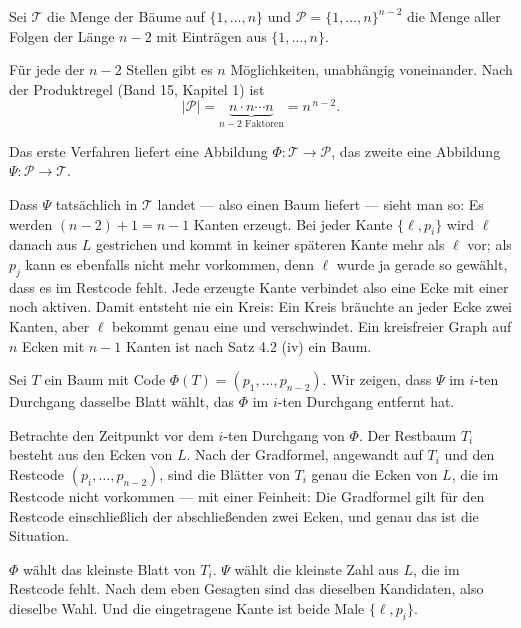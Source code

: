 \begin{merksatz}
Sei $\mathcal{T}$ die Menge der Bäume auf $\{1,\ldots,n\}$ und $\mathcal{P} = \{1,\ldots,n\}^{n-2}$ die Menge aller Folgen der Länge $n-2$ mit Einträgen aus $\{1,\ldots,n\}$.

Für jede der $n-2$ Stellen gibt es $n$ Möglichkeiten, unabhängig voneinander. Nach der Produktregel (Band 15, Kapitel 1) ist
\[ |\mathcal{P}| = \underbrace{n \cdot n \cdots n}_{n-2 \text{ Faktoren}} = n^{\,n-2} . \]

Das erste Verfahren liefert eine Abbildung $\Phi : \mathcal{T} \to \mathcal{P}$, das zweite eine Abbildung $\Psi : \mathcal{P} \to \mathcal{T}$.

Dass $\Psi$ tatsächlich in $\mathcal{T}$ landet --- also einen Baum liefert --- sieht man so: Es werden $(n-2) + 1 = n-1$ Kanten erzeugt. Bei jeder Kante $\{\ell, p_i\}$ wird $\ell$ danach aus $L$ gestrichen und kommt in keiner späteren Kante mehr als $\ell$ vor; als $p_j$ kann es ebenfalls nicht mehr vorkommen, denn $\ell$ wurde ja gerade so gewählt, dass es im Restcode fehlt. Jede erzeugte Kante verbindet also eine  Ecke mit einer noch aktiven. Damit entsteht nie ein Kreis: Ein Kreis bräuchte an jeder Ecke zwei Kanten, aber $\ell$ bekommt genau eine und verschwindet. Ein kreisfreier Graph auf $n$ Ecken mit $n-1$ Kanten ist nach Satz 4.2 (iv) ein Baum.

Sei $T$ ein Baum mit Code $\Phi(T) = (p_1,\ldots,p_{n-2})$. Wir zeigen, dass $\Psi$ im $i$-ten Durchgang dasselbe Blatt wählt, das $\Phi$ im $i$-ten Durchgang entfernt hat.

Betrachte den Zeitpunkt vor dem $i$-ten Durchgang von $\Phi$. Der Restbaum $T_i$ besteht aus den Ecken von $L$. Nach der Gradformel, angewandt auf $T_i$ und den Restcode $(p_i,\ldots,p_{n-2})$, sind die Blätter von $T_i$ genau die Ecken von $L$, die im Restcode nicht vorkommen --- mit einer Feinheit: Die Gradformel gilt für den Restcode einschließlich der abschließenden zwei Ecken, und genau das ist die Situation.

$\Phi$ wählt das kleinste Blatt von $T_i$. $\Psi$ wählt die kleinste Zahl aus $L$, die im Restcode fehlt. Nach dem eben Gesagten sind das dieselben Kandidaten, also dieselbe Wahl. Und die eingetragene Kante ist beide Male $\{\ell, p_i\}$.


\end{merksatz}
